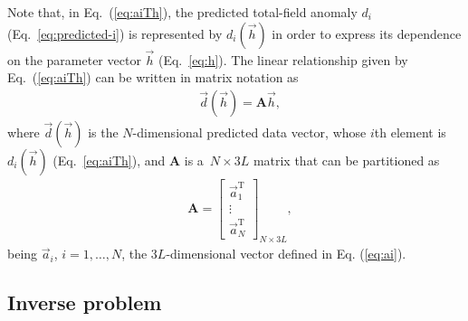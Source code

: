 \documentclass[journal abbreviation, npg]{copernicus}
\begin{document}
Note that, in Eq.~(\ref{eq:aiTh}), the predicted total-field anomaly $d_{i}$
(Eq.~\ref{eq:predicted-i}) is represented by $d_{i}(\vec{h})$ in order to
express its dependence on the parameter vector $\vec{h}$ (Eq.~\ref{eq:h}).
The linear relationship given by Eq.~(\ref{eq:aiTh}) can be written in matrix
notation as
\begin{align}
 &
\vec{d}(\vec{h}) = \mathbf{A}  \vec{h} ,
\label{eq:predicted-data-vector}
\end{align}
where $\vec{d}(\vec{h})$ is the $N$-dimensional predicted data vector, whose
$i$th element is $d_{i}(\vec{h})$ (Eq.~\ref{eq:aiTh}), and $\mathbf{A}$ is
a~$N \times 3L$ matrix that can be partitioned as
\begin{align}
 &
\mathbf{A} =
\left[
\begin{array}{c}
\vec{a}_{1}^{\mathrm{T}} \\
\vdots \\
\vec{a}_{N}^{\mathrm{T}}
\end{array}
\right]_{N \times 3L} ,
\label{eq:sensibility-matrix}
\end{align}
being $\vec{a}_{i}$, $i = 1, \ldots, N$, the $3L$-dimensional vector
defined in Eq. (\ref{eq:ai}).




\subsection{Inverse problem}
\end{document}
